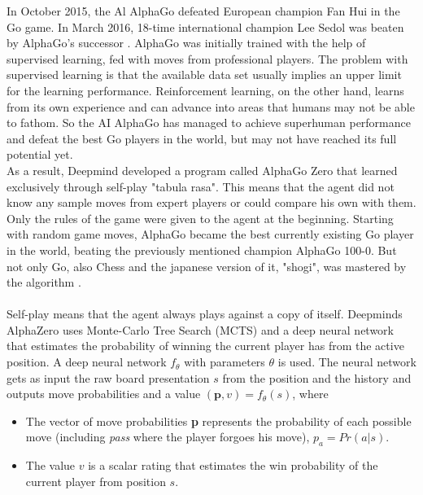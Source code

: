 In October 2015, the Al AlphaGo defeated European champion Fan Hui in the Go game. In March 2016, 18-time international champion Lee Sedol was beaten by AlphaGo's successor \cite{GoalphaGosilver2017mastering}. 
AlphaGo was initially trained with the help of supervised learning, fed with moves from professional players.
The problem with supervised learning is that the available data set usually implies an upper limit for the learning performance. Reinforcement learning, on the other hand, learns from its own experience and can advance into areas that humans may not be able to fathom. So the AI AlphaGo has managed to achieve superhuman performance and defeat the best Go players in the world, but may not have reached its full potential yet.\\
As a result, Deepmind developed a program called AlphaGo Zero that learned exclusively through self-play "tabula rasa". This means that the agent did not know any sample moves from expert players or could compare his own with them. Only the rules of the game were given to the agent at the beginning. Starting with random game moves, AlphaGo became the best currently existing Go player in the world, beating the previously mentioned champion AlphaGo 100-0. But not only Go, also Chess and the japanese version of it, "shogi", was mastered by the algorithm \cite{chessSilver2017mastering,GoalphaGosilver2017mastering}. \\
\\
Self-play means that the agent always plays against a copy of itself.
Deepminds AlphaZero uses Monte-Carlo Tree Search (MCTS) \cite{montecarlobrowne2012survey} and a deep neural network that estimates the probability of winning the current player has from the active position.
A deep neural network $f_\theta$ with parameters $\theta$ is used. The neural network gets as input the raw board presentation $s$ from the position and the history and outputs move probabilities and a value $(\textbf{p}, v) = f_\theta (s)$, where

\begin{description}

    \begin{itemize}
        \item The vector of move probabilities \textbf{p} represents the probability of each possible move (including \textit{pass} where the player forgoes his move), $p_a = Pr(a|s)$. 
        
        \item The value $v$ is a scalar rating that estimates the win probability of the current player from position $s$.
    \end{itemize}

\end{description}

